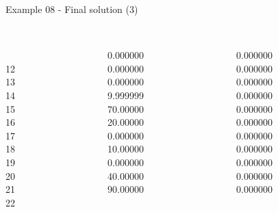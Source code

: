 \begin{frame}{Example 08 - Final solution (3)}
\footnotesize

\begin{columns}[t]
\begin{column}{0.3\textwidth}
\\
\\

12\\
13\\
14\\
15\\
16\\
17\\
18\\
19\\
20\\
21\\
22\\

\end{column}
\begin{column}{0.3\textwidth}

\\
0.000000\\
0.000000\\
0.000000\\
9.999999\\
70.00000\\
20.00000\\
0.000000\\
10.00000\\
0.000000\\
40.00000\\
90.00000\\

\end{column}

\begin{column}{0.3\textwidth}
\\
0.000000\\
0.000000\\
0.000000\\
0.000000\\
0.000000\\
0.000000\\
0.000000\\
0.000000\\
0.000000\\
0.000000\\
0.000000\\


\end{column}
\end{columns}

\end{frame}
